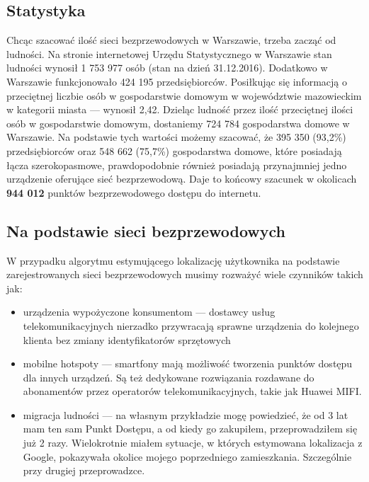\subsection{Statystyka}
Chcąc szacować ilość sieci bezprzewodowych w Warszawie, trzeba zacząć od ludności. Na stronie internetowej Urzędu Statystycznego w Warszawie stan ludności wynosił 1 753 977 osób (stan na dzień 31.12.2016). Dodatkowo w Warszawie funkcjonowało 424 195 przedsiębiorców. Posiłkując się informacją o przeciętnej liczbie osób w gospodarstwie domowym w województwie mazowieckim w kategorii miasta — wynosił 2,42.\cite{PrognozaGospodarstwGUS} Dzieląc ludność przez ilość przeciętnej ilości osób w gospodarstwie domowym, dostaniemy 724 784 gospodarstwa domowe w Warszawie. Na podstawie tych wartości możemy szacować, że 395 350 (93,2\%)\cite{SpoleczenstoInformacyjneGUS} przedsiębiorców oraz 548 662 (75,7\%) gospodarstwa domowe, które posiadają łącza szerokopasmowe, prawdopodobnie również posiadają przynajmniej jedno urządzenie oferujące sieć bezprzewodową. Daje to końcowy szacunek w okolicach \textbf{944 012} punktów bezprzewodowego dostępu do internetu.

\subsection{Na podstawie sieci bezprzewodowych}
W przypadku algorytmu estymującego lokalizację użytkownika na podstawie zarejestrowanych sieci bezprzewodowych musimy rozważyć wiele czynników takich jak:

\begin{itemize}
    \item urządzenia wypożyczone konsumentom — dostawcy usług telekomunikacyjnych nierzadko przywracają sprawne urządzenia do kolejnego klienta bez zmiany identyfikatorów sprzętowych
    \item mobilne hotspoty — smartfony mają możliwość tworzenia punktów dostępu dla innych urządzeń. Są też dedykowane rozwiązania rozdawane do abonamentów przez operatorów telekomunikacyjnych, takie jak Huawei MIFI.
    \item migracja ludności — na własnym przykładzie mogę powiedzieć, że od 3 lat mam ten sam Punkt Dostępu, a od kiedy go zakupiłem, przeprowadziłem się już 2 razy. Wielokrotnie miałem sytuacje, w których estymowana lokalizacja z Google, pokazywała okolice mojego poprzedniego zamieszkania. Szczególnie przy drugiej przeprowadzce.
\end{itemize}

